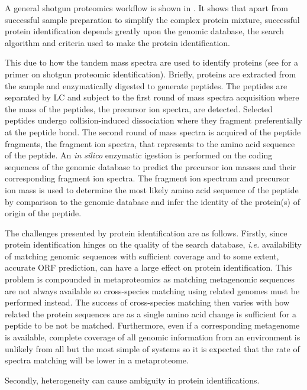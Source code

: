 A general shotgun proteomics workflow is shown in .
It shows that apart from successful sample preparation to simplify the complex protein mixture, successful protein identification depends greatly upon the genomic database, the search algorithm and criteria used to make the protein identification.

This due to how the tandem mass spectra are used to identify proteins (see \citet{Marcotte2007} for a primer on shotgun proteomic identification).
Briefly, proteins are extracted from the sample and enzymatically digested to generate peptides.
The peptides are separated by \ac{LC} and subject to the first round of mass spectra acquisition where the mass of the peptides, the precursor ion spectra, are detected.
Selected peptides undergo collision-induced dissociation where they fragment preferentially at the peptide bond.
The second round of mass spectra is acquired of the peptide fragments, the fragment ion spectra, that represents to the amino acid sequence of the peptide.
An \emph{in silico} enzymatic igestion is performed on the coding sequences of the genomic database to predict the precursor ion masses and their corresponding fragment ion spectra.
The fragment ion spectrum and precursor ion mass is used to determine the most likely amino acid sequence of the peptide by comparison to the genomic database and infer the identity of the protein(s) of origin of the peptide.

The challenges presented by protein identification are as follows.
Firstly, since protein identification hinges on the quality of the search database, \emph{i.e.} availability of matching genomic sequences with sufficient coverage and to some extent, accurate \ac{ORF} prediction, can have a large effect on protein identification.
This problem is compounded in metaproteomics as matching metagenomic sequences are not always available so cross-species matching using related genomes must be performed instead.
The success of cross-species matching then varies with how related the protein sequences are as a single amino acid change is sufficient for a peptide to be not be matched.
Furthermore, even if a corresponding metagenome is available, complete coverage of all genomic information from an environment is unlikely from all but the most simple of systems so it is expected that the rate of spectra matching will be lower in a metaproteome.

Secondly, heterogeneity can cause ambiguity in protein identifications.



